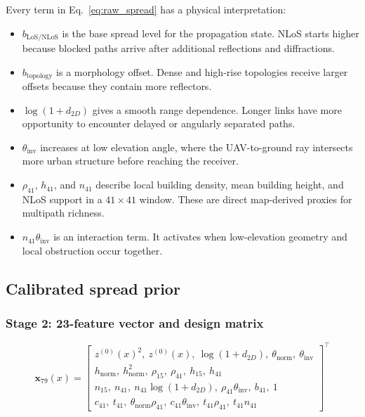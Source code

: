 Every term in Eq.~\eqref{eq:raw_spread} has a physical interpretation:
\begin{itemize}
\item \(b_{\mathrm{LoS/NLoS}}\) is the base spread level for the propagation
      state. NLoS starts higher because blocked paths arrive after additional
      reflections and diffractions.
\item \(b_{\mathrm{topology}}\) is a morphology offset. Dense and high-rise
      topologies receive larger offsets because they contain more reflectors.
\item \(\log(1+d_{2D})\) gives a smooth range dependence. Longer links have
      more opportunity to encounter delayed or angularly separated paths.
\item \(\theta_{\mathrm{inv}}\) increases at low elevation angle, where the
      UAV-to-ground ray intersects more urban structure before reaching the
      receiver.
\item \(\rho_{41}\), \(h_{41}\), and \(n_{41}\) describe local building
      density, mean building height, and NLoS support in a \(41\times41\)
      window. These are direct map-derived proxies for multipath richness.
\item \(n_{41}\theta_{\mathrm{inv}}\) is an interaction term. It activates
      when low-elevation geometry and local obstruction occur together.
\end{itemize}

\subsection{Calibrated spread prior}

\subsubsection{Stage 2: 23-feature vector and design matrix}

\begin{equation}
\textbf{x}_{79}(x) = \begin{bmatrix}
z^{(0)}(x)^2,\ z^{(0)}(x),\ \log(1+d_{2D}),\ \theta_{\mathrm{norm}},\ \theta_{\mathrm{inv}}\\
h_{\mathrm{norm}},\ h_{\mathrm{norm}}^2,\ \rho_{15},\ \rho_{41},\ h_{15},\ h_{41}\\
n_{15},\ n_{41},\ n_{41}\log(1+d_{2D}),\ \rho_{41}\theta_{\mathrm{inv}},\ b_{41},\ 1\\
c_{41},\ t_{41},\ \theta_{\mathrm{norm}}\rho_{41},\ c_{41}\theta_{\mathrm{inv}},\ t_{41}\rho_{41},\ t_{41}n_{41}
\end{bmatrix}^\top
\label{eq:x79}
\end{equation}

